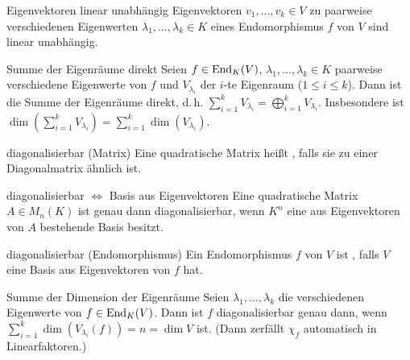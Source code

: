 \begin{Satz}{Eigenvektoren linear unabhängig}
    Eigenvektoren $v_1, \ldots, v_k \in V$ zu paarweise verschiedenen
    Eigenwerten $\lambda_1, \ldots, \lambda_k \in K$ eines Endomorphismus $f$
    von $V$ sind linear unabhängig.
\end{Satz}

\begin{Satz}{Summe der Eigenräume direkt}
    Seien $f \in \operatorname{End}_K(V)$, $\lambda_1, \ldots, \lambda_k \in K$
    paarweise verschiedene Eigenwerte von $f$ und
    $V_{\lambda_i}$ der $i$-te Eigenraum
    ($1 \le i \le k$).
    Dann ist die Summe der Eigenräume direkt, d.\,h.
    $\sum_{i=1}^k V_{\lambda_i} = \bigoplus_{i=1}^k V_{\lambda_i}$.
    Insbesondere ist
    $\dim \left(\sum_{i=1}^k V_{\lambda_i}\right) =
    \sum_{i=1}^k \dim(V_{\lambda_i})$.
\end{Satz}

\begin{Def}{diagonalisierbar (Matrix)}
    Eine quadratische Matrix heißt ,
    falls sie zu einer Diagonalmatrix ähnlich ist.
\end{Def}

\begin{Satz}{diagonalisierbar $\Leftrightarrow$ Basis aus Eigenvektoren}
    Eine quadratische Matrix $A \in M_n(K)$ ist genau dann
    diagonalisierbar, wenn $K^n$ eine aus Eigenvektoren von $A$ bestehende
    Basis besitzt.
\end{Satz}

\begin{Def}{diagonalisierbar (Endomorphismus)}
    Ein Endomorphismus $f$ von $V$ ist , falls
    $V$ eine Basis aus Eigenvektoren von $f$ hat.
\end{Def}

\begin{Satz}{Summe der Dimension der Eigenräume}
    Seien $\lambda_1, \ldots, \lambda_k$ die verschiedenen Eigenwerte von
    $f \in \operatorname{End}_K(V)$.
    Dann ist $f$ diagonalisierbar genau dann, wenn \\
    $\sum_{i=1}^k \dim(V_{\lambda_i}(f)) = n = \dim V$ ist.
    (Dann zerfällt $\chi_f$ automatisch in Linearfaktoren.)
\end{Satz}

\pagebreak

